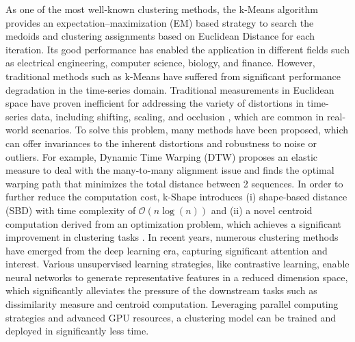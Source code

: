 As one of the most well-known clustering methods, the k-Means algorithm \cite{macqueen1967some} provides an expectation–maximization (EM) based strategy to search the medoids and clustering assignments based on Euclidean Distance for each iteration. Its good performance has enabled the application in different fields such as electrical engineering, computer science, biology, and finance.
However, traditional methods such as k-Means have suffered from significant performance degradation in the time-series domain. 
Traditional measurements in Euclidean space have proven inefficient for addressing the variety of distortions in time-series data, including shifting, scaling, and occlusion \cite{paparrizos2015k},
which are common in real-world scenarios. To solve this problem, many methods have been proposed, which can offer invariances to the inherent distortions and robustness to noise or outliers. For example, Dynamic Time Warping (DTW) \cite{chu2002iterative} proposes an elastic measure to deal with the many-to-many alignment issue and finds the optimal warping path that minimizes the total distance between 2 sequences. In order to further reduce the computation cost, k-Shape \cite{paparrizos2015k} introduces (i) shape-based distance (SBD) with time complexity of $\mathcal{O}(n\log(n))$ and (ii) a novel centroid computation derived from an optimization problem, which achieves a significant improvement in clustering tasks \cite{paparrizos2015k,paparrizos2023odyssey}. In recent years, numerous clustering methods have emerged from the deep learning era, capturing significant attention and interest. Various unsupervised learning strategies, like contrastive learning, enable neural networks to generate representative features in a reduced dimension space, which significantly alleviates the pressure of the downstream tasks such as dissimilarity measure and centroid computation. Leveraging parallel computing strategies and advanced GPU resources, a clustering model can be trained and deployed in significantly less time.


